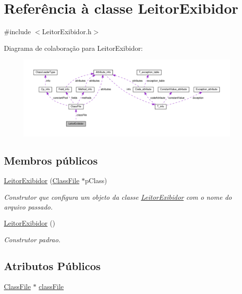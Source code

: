 \hypertarget{classLeitorExibidor}{}\section{Referência à classe Leitor\+Exibidor}
\label{classLeitorExibidor}


{\ttfamily \#include $<$Leitor\+Exibidor.\+h$>$}



Diagrama de colaboração para Leitor\+Exibidor\+:
\nopagebreak
\begin{figure}[H]
\begin{center}
\leavevmode
\includegraphics[width=350pt]{classLeitorExibidor__coll__graph}
\end{center}
\end{figure}
\subsection*{Membros públicos}
\begin{DoxyCompactItemize}
\item 
\hyperlink{classLeitorExibidor_a3a925accb2da9a51859f02005737e58f}{Leitor\+Exibidor} (\hyperlink{classClassFile}{Class\+File} $\ast$p\+Class)
\begin{DoxyCompactList}\small\item\em Construtor que configura um objeto da classe \hyperlink{classLeitorExibidor}{Leitor\+Exibidor} com o nome do arquivo passado. \end{DoxyCompactList}\item 
\hyperlink{classLeitorExibidor_a246be764c0b6895539f915cc0f813e7b}{Leitor\+Exibidor} ()
\begin{DoxyCompactList}\small\item\em Construtor padrao. \end{DoxyCompactList}\end{DoxyCompactItemize}
\subsection*{Atributos Públicos}
\begin{DoxyCompactItemize}
\item 
\hyperlink{classClassFile}{Class\+File} $\ast$ \hyperlink{classLeitorExibidor_abd4251746a10c01f8bb566c4d6ba55b4}{class\+File}
\end{DoxyCompactItemize}


